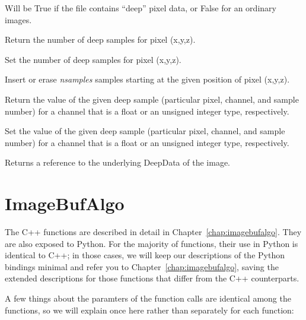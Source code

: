 Will be {\cf True} if the file contains ``deep'' pixel data, or {\cf False}
for an ordinary images.
\apiend

Return the number of deep samples for pixel (x,y,z).
\apiend

Set the number of deep samples for pixel (x,y,z).
\apiend

Insert or erase \emph{nsamples} samples starting at the given position of
pixel {\cf (x,y,z)}.
\apiend

Return the value of the given deep sample (particular pixel, channel, and
sample number) for a channel that is a float or an unsigned integer type,
respectively.
\apiend

Set the value of the given deep sample (particular pixel, channel, and
sample number) for a channel that is a float or an unsigned integer type,
respectively.
\apiend

Returns a reference to the underlying {\cf DeepData} of the image.
\apiend




\newpage
\section{ImageBufAlgo}
\label{sec:pythonimagebufalgo}

The C++ \IBA functions are described in detail in
Chapter~\ref{chap:imagebufalgo}.  They are also exposed to Python.
For the majority of \IBA functions, their use in Python is identical
to C++; in those cases, we will keep our descriptions of the Python
bindings minimal and refer you to Chapter~\ref{chap:imagebufalgo}, saving
the extended descriptions for those functions that differ from the C++
counterparts.

A few things about the paramters of the \IBA function calls are identical
among the functions, so we will explain once here rather than separately for
each function:


